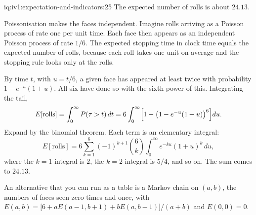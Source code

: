 \begin{solution}{iq:iv1:expectation-and-indicators:25}
The expected number of rolls is about $24.13$.

Poissonisation makes the faces independent. Imagine rolls arriving as a Poisson process of rate one per unit time. Each face then appears as an independent Poisson process of rate $1/6$. The expected stopping time in clock time equals the expected number of rolls, because each roll takes one unit on average and the stopping rule looks only at the rolls.

By time $t$, with $u = t/6$, a given face has appeared at least twice with probability $1 - e^{-u}(1 + u)$. All six have done so with the sixth power of this. Integrating the tail,
\[
E[\text{rolls}] = \int_0^\infty P(\tau > t)\,dt = 6 \int_0^\infty \Bigl[1 - \bigl(1 - e^{-u}(1 + u)\bigr)^6\Bigr] du.
\]
Expand by the binomial theorem. Each term is an elementary integral:
\[
E[\text{rolls}] = 6 \sum_{k=1}^{6} (-1)^{k+1} \binom{6}{k} \int_0^\infty e^{-ku}(1 + u)^k\,du,
\]
where the $k = 1$ integral is $2$, the $k = 2$ integral is $5/4$, and so on. The sum comes to $24.13$.

An alternative that you can run as a table is a Markov chain on $(a, b)$, the numbers of faces seen zero times and once, with $E(a,b) = \bigl[6 + a E(a-1, b+1) + b E(a, b-1)\bigr]/(a+b)$ and $E(0,0)=0$.

\end{solution}
